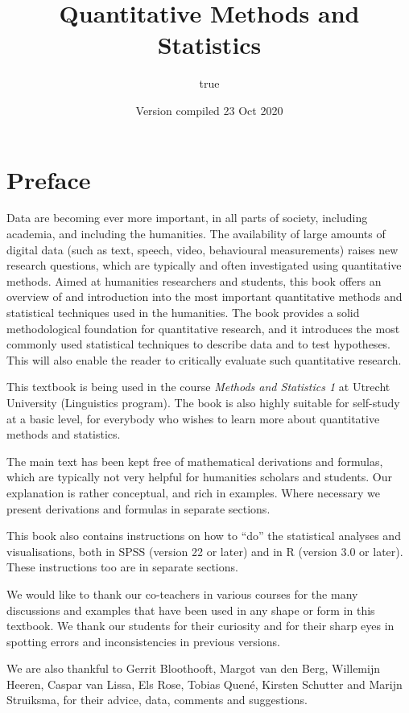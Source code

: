 \documentclass[
]{book}
\title{Quantitative Methods and Statistics}
\author{true}
\date{Version compiled 23 Oct 2020}
\begin{document}
\maketitle

{
\setcounter{tocdepth}{1}
\tableofcontents
}
\hypertarget{preface}{%
\chapter*{Preface}\label{preface}}

Data are becoming ever more important, in all parts of society, including academia, and including the humanities. The availability of large amounts of digital data (such as text, speech, video, behavioural measurements) raises new research questions, which are typically and often investigated using quantitative methods.
Aimed at humanities researchers and students, this book offers an overview of and introduction into the most important quantitative methods and statistical techniques used in the humanities. The book provides a solid methodological foundation for quantitative research, and it introduces the most commonly used statistical techniques to describe data and to test hypotheses. This will also enable the reader to critically evaluate such quantitative research.

This textbook is being used in the course \emph{Methods and Statistics 1} at Utrecht University (Linguistics program). The book is also highly suitable for self-study at a basic level, for everybody who wishes to learn more about quantitative methods and statistics.

The main text has been kept free of mathematical derivations and formulas, which are typically not very helpful for humanities scholars and students. Our explanation is rather conceptual, and rich in examples. Where necessary we present derivations and formulas in separate sections.

This book also contains instructions on how to ``do'' the statistical analyses and visualisations, both in SPSS (version 22 or later) and in R (version 3.0 or later). These instructions too are in separate sections.

We would like to thank our co-teachers in various courses for the many discussions and examples that have been used in any shape or form in this textbook. We thank our students for their curiosity and for their sharp eyes in spotting errors and inconsistencies in previous versions.

We are also thankful to
Gerrit Bloothooft,
Margot van den Berg,
Willemijn Heeren,
Caspar van Lissa,
Els Rose,
Tobias Quené,
Kirsten Schutter
and Marijn Struiksma,
for their advice, data, comments and suggestions.
\end{document}
